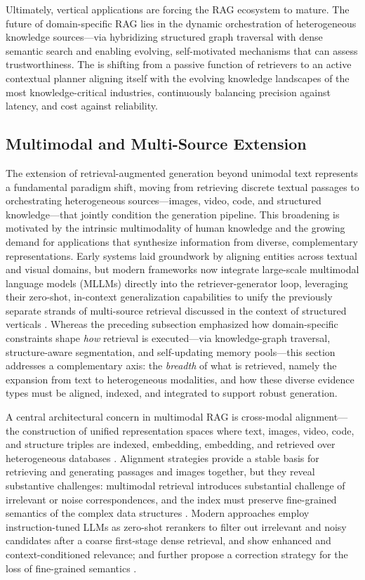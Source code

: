 \documentclass[11pt,a4paper]{article}
\begin{document}
Ultimately, vertical applications are forcing the RAG ecosystem to mature. The future of domain-specific RAG lies in the dynamic orchestration of heterogeneous knowledge sources---via hybridizing structured graph traversal with dense semantic search and enabling evolving, self-motivated mechanisms that can assess trustworthiness. The \cite{arxiv:2406.07515v1} is shifting from a passive function of retrievers to an active contextual planner aligning itself with the evolving knowledge landscapes of the most knowledge-critical industries, continuously balancing precision against latency, and cost against reliability.


\subsection{Multimodal and Multi-Source Extension}


The extension of retrieval-augmented generation beyond unimodal text represents a fundamental paradigm shift, moving from retrieving discrete textual passages to orchestrating heterogeneous sources---images, video, code, and structured knowledge---that jointly condition the generation pipeline. This broadening is motivated by the intrinsic multimodality of human knowledge and the growing demand for applications that synthesize information from diverse, complementary representations. Early systems laid groundwork by aligning entities across textual and visual domains, but modern frameworks now integrate large-scale multimodal language models (MLLMs) directly into the retriever-generator loop, leveraging their zero-shot, in-context generalization capabilities to unify the previously separate strands of multi-source retrieval discussed in the context of structured verticals \cite{arxiv:2005.11401v4}. Whereas the preceding subsection emphasized how domain-specific constraints shape \emph{how} retrieval is executed---via knowledge-graph traversal, structure-aware segmentation, and self-updating memory pools---this section addresses a complementary axis: the \emph{breadth} of what is retrieved, namely the expansion from text to heterogeneous modalities, and how these diverse evidence types must be aligned, indexed, and integrated to support robust generation.

A central architectural concern in multimodal RAG is cross-modal alignment---the construction of unified representation spaces where text, images, video, code, and structure triples are indexed, embedding, embedding, and retrieved over heterogeneous databases \cite{arxiv:2005.11401v4}. Alignment strategies provide a stable basis for retrieving and generating passages and images together, but they reveal substantive challenges: multimodal retrieval introduces substantial challenge of irrelevant or noise correspondences, and the index must preserve fine-grained semantics of the complex data structures \cite{arxiv:2404.10981v1}. Modern approaches employ instruction-tuned LLMs as zero-shot rerankers to filter out irrelevant and noisy candidates after a coarse first-stage dense retrieval, and show enhanced and context-conditioned relevance; and further propose a correction strategy for the loss of fine-grained semantics \cite{arxiv:2404.10981v1}.
\end{document}
